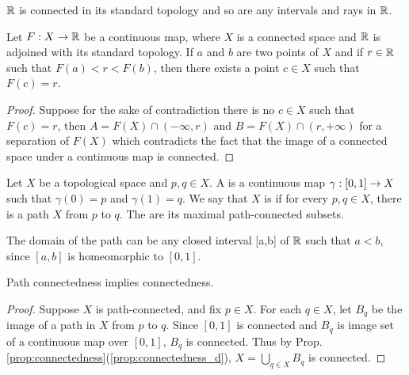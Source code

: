 \documentclass[11pt,a4paper]{article}
\begin{document}
\begin{lemma}
$\mathbb{R}$ is connected in its standard topology and so are any intervals and rays in $\mathbb{R}$.
\end{lemma}

\begin{prop}
Let $F:X\rightarrow \mathbb{R}$ be a continuous map, where $X$ is a connected space and $\mathbb{R}$ is adjoined with its standard topology. If $a$ and $b$ are two points of $X$ and if $r\in \mathbb{R}$ such that $F(a)<r<F(b)$, then there exists a point $c\in X$ such that $F(c) = r$.
\end{prop}

\begin{proof}
Suppose for the sake of contradiction there is no $c\in X$ such that $F(c) = r$, then $A = F(X)\cap (-\infty,r)$ and $B = F(X)\cap(r,+\infty)$ for a separation of $F(X)$ which contradicts the fact that the image of a connected space under a continuous map is connected.
\end{proof}

\begin{mydef}
Let $X$ be a topological space and $p,q\in X$. A  is a continuous map $\gamma:[0,1]\rightarrow X$ such that $\gamma(0) = p$ and $\gamma(1) = q$. We say that $X$ is  if for every $p,q\in X$, there is a path $X$ from $p$ to $q$. The  are its maximal path-connected subsets.
\end{mydef}

\begin{remark}
The domain of the path can be any closed interval [a,b] of $\mathbb{R}$ such that $a<b$, since $[a,b]$ is homeomorphic to $[0,1]$.
\end{remark}

\begin{prop}\label{prop:path_connectedness_implies_connectedness}
Path connectedness implies connectedness.
\end{prop}

\begin{proof}
Suppose $X$ is path-connected, and fix $p\in X$. For each $q\in X$, let $B_q$ be the image of a path in $X$ from $p$ to $q$. Since $[0,1]$ is connected and $B_q$ is image set of a continuous map over $[0,1]$, $B_q$ is connected. Thus by Prop. \ref{prop:connectedness}(\ref{prop:connectedness_d}), $X=\bigcup_{q\in X} B_q$ is connected.
\end{proof}
\end{document}
